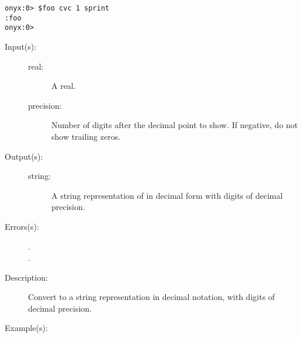 \begin{description}
\begin{description}
\begin{verbatim}
onyx:0> $foo cvc 1 sprint
:foo
onyx:0>
		\end{verbatim}
	\end{description}
\label{systemdict:cvds}
\item[{\onyxop{real precision}{cvds}{string}}: ]
	\begin{description}\item[]
	\item[Input(s): ]
		\begin{description}\item[]
		\item[real: ]
			A real.
		\item[precision: ]
			Number of digits after the decimal point to show.  If
			negative, do not show trailing zeros.
		\end{description}
	\item[Output(s): ]
		\begin{description}\item[]
		\item[string: ]
			A string representation of  in decimal form
			with  digits of decimal precision.
		\end{description}
	\item[Errors(s): ]
		\begin{description}\item[]
		\item[.]
		\item[.]
		\end{description}
	\item[Description: ]
		Convert  to a string representation in decimal
		notation, with  digits of decimal precision.
	\item[Example(s): ]\begin{verbatim}


\end{verbatim}
\end{description}
\end{description}
